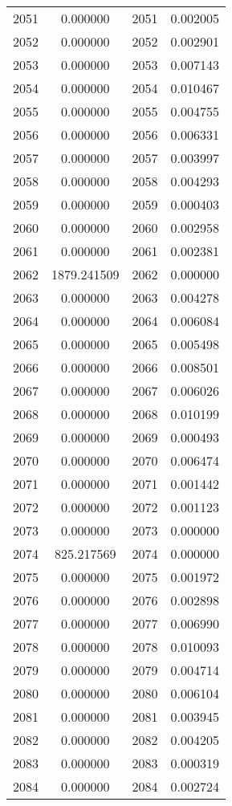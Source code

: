 \documentclass[12pt]{article}
\begin{document}
\begin{longtable}{@{}cccc@{}}
2051 & 0.000000 & 2051 & 0.002005 \\
2052 & 0.000000 & 2052 & 0.002901 \\
2053 & 0.000000 & 2053 & 0.007143 \\
2054 & 0.000000 & 2054 & 0.010467 \\
2055 & 0.000000 & 2055 & 0.004755 \\
2056 & 0.000000 & 2056 & 0.006331 \\
2057 & 0.000000 & 2057 & 0.003997 \\
2058 & 0.000000 & 2058 & 0.004293 \\
2059 & 0.000000 & 2059 & 0.000403 \\
2060 & 0.000000 & 2060 & 0.002958 \\
2061 & 0.000000 & 2061 & 0.002381 \\
2062 & 1879.241509 & 2062 & 0.000000 \\
2063 & 0.000000 & 2063 & 0.004278 \\
2064 & 0.000000 & 2064 & 0.006084 \\
2065 & 0.000000 & 2065 & 0.005498 \\
2066 & 0.000000 & 2066 & 0.008501 \\
2067 & 0.000000 & 2067 & 0.006026 \\
2068 & 0.000000 & 2068 & 0.010199 \\
2069 & 0.000000 & 2069 & 0.000493 \\
2070 & 0.000000 & 2070 & 0.006474 \\
2071 & 0.000000 & 2071 & 0.001442 \\
2072 & 0.000000 & 2072 & 0.001123 \\
2073 & 0.000000 & 2073 & 0.000000 \\
2074 & 825.217569 & 2074 & 0.000000 \\
2075 & 0.000000 & 2075 & 0.001972 \\
2076 & 0.000000 & 2076 & 0.002898 \\
2077 & 0.000000 & 2077 & 0.006990 \\
2078 & 0.000000 & 2078 & 0.010093 \\
2079 & 0.000000 & 2079 & 0.004714 \\
2080 & 0.000000 & 2080 & 0.006104 \\
2081 & 0.000000 & 2081 & 0.003945 \\
2082 & 0.000000 & 2082 & 0.004205 \\
2083 & 0.000000 & 2083 & 0.000319 \\
2084 & 0.000000 & 2084 & 0.002724 \\

\end{longtable}
\end{document}
